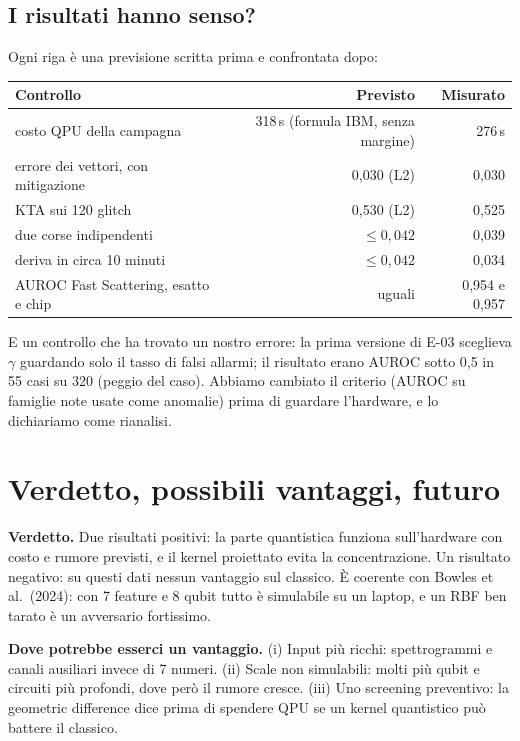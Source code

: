 \subsection{I risultati hanno senso?}
Ogni riga è una previsione scritta prima e confrontata dopo:
\begin{center}
\begin{tabular}{@{}lrr@{}}
\toprule
Controllo & Previsto & Misurato\\
\midrule
costo QPU della campagna & 318\,s (formula IBM, senza margine) & 276\,s\\
errore dei vettori, con mitigazione & 0,030 (L2) & 0,030\\
KTA sui 120 glitch & 0,530 (L2) & 0,525\\
due corse indipendenti & $\leq0{,}042$ & 0,039\\
deriva in circa 10 minuti & $\leq0{,}042$ & 0,034\\
AUROC Fast Scattering, esatto e chip & uguali & 0,954 e 0,957\\
\bottomrule
\end{tabular}
\end{center}
E un controllo che ha trovato un nostro errore: la prima versione di E-03 sceglieva $\gamma$ guardando solo il tasso di
falsi allarmi; il risultato erano AUROC sotto 0,5 in 55 casi su 320 (peggio del caso). Abbiamo cambiato il criterio
(AUROC su famiglie note usate come anomalie) prima di guardare l’hardware, e lo dichiariamo come rianalisi.

\section{Verdetto, possibili vantaggi, futuro}

\textbf{Verdetto.} Due risultati positivi: la parte quantistica funziona sull’hardware con costo e rumore previsti, e
il kernel proiettato evita la concentrazione. Un risultato negativo: su questi dati nessun vantaggio sul classico.
È coerente con Bowles et al.\ (2024): con 7 feature e 8 qubit tutto è simulabile su un laptop, e un RBF ben tarato è
un avversario fortissimo.

\textbf{Dove potrebbe esserci un vantaggio.} (i) Input più ricchi: spettrogrammi e canali ausiliari invece di 7 numeri.
(ii) Scale non simulabili: molti più qubit e circuiti più profondi, dove però il rumore cresce. (iii) Uno screening
preventivo: la geometric difference dice prima di spendere QPU se un kernel quantistico può battere il classico.

